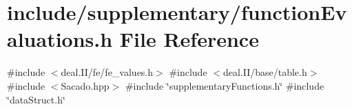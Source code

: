 \section{include/supplementary/function\+Evaluations.h File Reference}
\label{function_evaluations_8h}
{\ttfamily \#include $<$deal.\+I\+I/fe/fe\+\_\+values.\+h$>$}\newline
{\ttfamily \#include $<$deal.\+I\+I/base/table.\+h$>$}\newline
{\ttfamily \#include $<$Sacado.\+hpp$>$}\newline
{\ttfamily \#include \char`\"{}supplementary\+Functions.\+h\char`\"{}}\newline
{\ttfamily \#include \char`\"{}data\+Struct.\+h\char`\"{}}\newline
